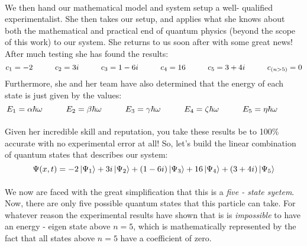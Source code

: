 \documentclass[12pt,letterpaper]{book}
\begin{document}
\paragraph*{}We then hand our mathematical model and system setup a well- qualified experimentalist. She then takes our setup, and applies what she knows about both the mathematical and practical end of quantum physics (beyond the scope of this work) to our system. She returns to us soon after with some great news! After much testing she has found the results:
\begin{equation}
c_1 = -2 \hspace*{1cm}
c_2 = 3i \hspace*{1cm}
c_3 = 1 - 6i \hspace{1cm}
c_4 = 16 \hspace*{1cm}
c_5 = 3 + 4i \hspace{1cm}
c_{(n > 5)} = 0
\end{equation}
Furthermore, she and her team have also determined that the energy of each state is just given by the values:
\begin{equation}
E_1 = \alpha\hbar\omega \hspace*{1cm} 
E_2 = \beta\hbar\omega \hspace*{1cm} 
E_3 = \gamma\hbar\omega \hspace*{1cm}
E_4 = \zeta\hbar\omega \hspace*{1cm} 
E_5 = \eta\hbar\omega \hspace*{1cm}
\end{equation}

\paragraph*{}Given her incredible skill and reputation, you take these results be to 100\% accurate with no experimental error at all! So, let's build the linear combination of quantum states that describes our system:
\begin{equation}
\Psi(x,t) = -2\ket{\Psi_1} + 3i\ket{\Psi_2} + (1-6i)\ket{\Psi_3} +
16\ket{\Psi_4} + (3 + 4i)\ket{\Psi_5}
\end{equation}

\paragraph*{}We now are faced with the great simplification that this is a \textit{five - state syetem}. Now, there are only five possible quantum states that this particle can take. For whatever reason the experimental results have shown that is is \textit{impossible} to have an energy - eigen state above $n = 5$, which is mathematically represented by the fact that all states above $n = 5$ have a coefficient of zero. 
\end{document}
